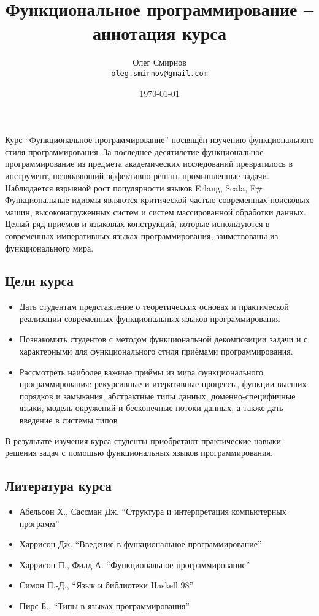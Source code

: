 \documentclass[a4paper,11pt]{article}
\author{Олег Смирнов \\
\texttt{oleg.smirnov@gmail.com}}
\date{\today}
\title{Функциональное программирование -- аннотация курса}
\begin{document}
\maketitle

Курс ``Функциональное программирование'' посвящён изучению функционального 
стиля программирования. За последнее десятилетие функциональное 
программирование из предмета академических исследований превратилось в
инструмент, позволяющий эффективно решать промышленные задачи. Наблюдается
взрывной рост популярности языков Erlang, Scala, F\#. Функциональные 
идиомы являются критической частью современных поисковых машин,
высоконагруженных систем и систем массированной обработки данных. Целый
ряд приёмов и языковых конструкций, которые используются в современных
императивных языках программирования, заимствованы из функционального мира.

\subsection*{Цели курса}
\begin{itemize}
\item Дать студентам представление о теоретических основах и практической
реализации современных функциональных языков программирования
\item Познакомить студентов с методом функциональной декомпозиции задачи
и с характерными для функционального стиля приёмами программирования.
\item Рассмотреть наиболее важные приёмы из мира функционального
программирования: рекурсивные и итеративные процессы, функции высших порядков
и замыкания, абстрактные типы данных, доменно-специфичные языки, модель
окружений и бесконечные потоки данных, а также дать введение в системы типов
\end{itemize}

В результате изучения курса студенты приобретают практические навыки
решения задач с помощью функциональных языков программирования.

\subsection*{Литература курса}
\begin{itemize}
\item Абельсон Х., Сассман Дж. ``Структура и интерпретация компьютерных программ''
\item Харрисон Дж. ``Введение в функциональное программирование''
\item Харрисон П., Филд А. ``Функциональное программирование''
\item Симон П.-Д., ``Язык и библиотеки Haskell 98''
\item Пирс Б., ``Типы в языках программирования''
\end{itemize}
\end{document}
